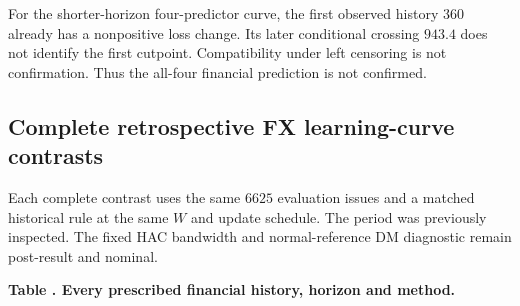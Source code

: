 \noindent\begin{minipage}{0.98\linewidth}\scriptsize For the shorter-horizon four-predictor curve, the first observed history $360$ already has a nonpositive loss change. Its later conditional crossing $943.4$ does not identify the first cutpoint. Compatibility under left censoring is not confirmation. Thus the all-four financial prediction is not confirmed.\end{minipage}\par\smallskip
\clearpage
\subsection*{Complete retrospective FX learning-curve contrasts}
\noindent\begin{minipage}{0.98\linewidth}\scriptsize Each complete contrast uses the same $6625$ evaluation issues and a matched historical rule at the same $W$ and update schedule. The period was previously inspected. The fixed HAC bandwidth and normal-reference DM diagnostic remain post-result and nominal.\end{minipage}\par\smallskip
\par\medskip{}\label{tab:v9-financial-full}
\noindent\textbf{Table \thetable. Every prescribed financial history, horizon and method.}\par
